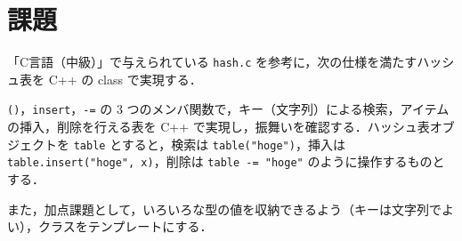 \section{課題}

「C言語（中級）」で与えられている {\tt hash.c} を参考に，次の仕様を満たすハッシュ表を C++ の class で実現する．

{\tt ()}，{\tt insert}，{\tt -=} の 3 つのメンバ関数で，キー（文字列）による検索，アイテムの挿入，削除を行える表を C++ で実現し，振舞いを確認する．ハッシュ表オブジェクトを {\tt table} とすると，検索は {\tt table("hoge")}，挿入は {\tt table.insert("hoge", x)}，削除は {\tt table -= "hoge"} のように操作するものとする．

また，加点課題として，いろいろな型の値を収納できるよう（キーは文字列でよい），クラスをテンプレートにする．
